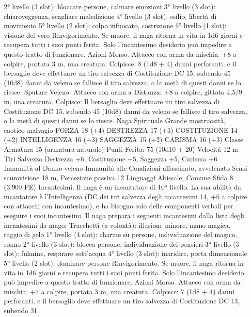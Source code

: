 \begin{multicols}{2}
2° livello (3 slot): bloccare persone, calmare emozioni
3° livello (3 slot): chiaroveggenza, scagliare maledizione
4° livello (3 slot): esilio, libertà di movimento
5° livello (2 slot): colpo infuocato, costrizione
6° livello (1 slot): visione del vero
Rinvigorimento. Se muore, il naga ritorna in vita in 1d6 giorni e
recupera tutti i suoi punti ferita. Solo l’incantesimo desiderio può
impedire a questo tratto di funzionare.
Azioni
Morso. Attacco con arma da mischia: +8 a colpire, portata 3 m,
una creatura.
Colpisce: 8 (1d8 + 4) danni perforanti, e il bersaglio deve
effettuare un tiro salvezza di Costituzione DC 15, subendo 45
(10d8) danni da veleno se fallisce il tiro salvezza, o la metà di
questi danni se lo riesce.
Sputare Veleno. Attacco con arma a Distanza: +8 a colpire,
gittata 4,5/9 m, una creatura.
Colpisce: Il bersaglio deve effettuare un tiro salvezza di
Costituzione DC 15, subendo 45 (10d8) danni da veleno se
fallisce il tiro salvezza, o la metà di questi danni se lo riesce.
Naga Spirituale
Grande mostruosità, caotico malvagio
FORZA 18 (+4)
DESTREZZA 17 (+3)
COSTITUZIONE 14 (+2)
INTELLIGENZA 16 (+3)
SAGGEZZA 15 (+2)
CARISMA 16 (+3)
Classe Armatura 15 (armatura naturale)
\hspace*{0pt}\hfill{Punti Ferita}: 75 (10d10 + 20)
Velocità 12 m
Tiri Salvezza Destrezza +6, Costituzione +5, Saggezza +5,
Carisma +6
Immunità al Danno veleno
Immunità alle Condizioni affascinato, avvelenato
Sensi scurovisione 18 m, Percezione passiva 12
Linguaggi Abissale, Comune
Sfida 8 (3.900 PE)
Incantesimi. Il naga è un incantatore di 10° livello. La sua abilità
da incantatore è l’Intelligenza (DC dei tiri salvezza degli
incantesimi 14, +6 a colpire con attacchi con incantesimo), e ha
bisogno solo delle componenti verbali per eseguire i suoi
incantesimi. Il naga prepara i seguenti incantesimi dalla lista
degli incantesimi da mago:
Trucchetti (a volontà): illusione minore, mano magica, raggio di
gelo
1° livello (4 slot): charme su persone, individuazione del magico,
sonno
2° livello (3 slot): blocca persone, individuazione dei pensieri
3° livello (3 slot): fulmine, respirare sott'acqua
4° livello (3 slot): inaridire, porta dimensionale
5° livello (2 slot): dominare persone
Rinvigorimento. Se muore, il naga ritorna in vita in 1d6 giorni e
recupera tutti i suoi punti ferita. Solo l’incantesimo desiderio può
impedire a questo tratto di funzionare.
Azioni
Morso. Attacco con arma da mischia: +7 a colpire, portata 3 m,
una creatura.
Colpisce: 7 (1d8 + 4) danni perforanti, e il bersaglio deve
effettuare un tiro salvezza di Costituzione DC 13, subendo 31

\end{multicols}
